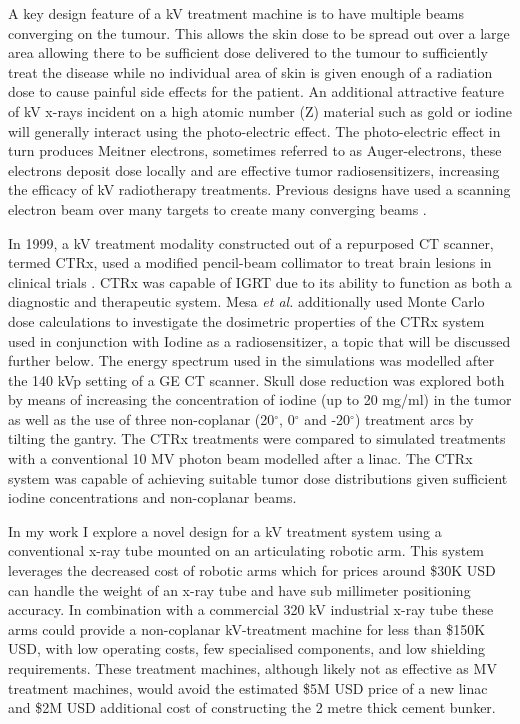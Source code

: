 A key design feature of a kV treatment machine is to have multiple beams converging on the tumour. This allows the skin dose to be spread out over a large area allowing there to be sufficient dose delivered to the tumour to sufficiently treat the disease while no individual area of skin is given enough of a radiation dose to cause painful side effects for the patient. An additional attractive feature of kV x-rays incident on a high atomic number (Z) material such as gold or iodine will generally interact using the photo-electric effect. The photo-electric effect in turn produces Meitner electrons, sometimes referred to as Auger-electrons, these electrons deposit dose locally and are effective tumor radiosensitizers, increasing the efficacy of kV radiotherapy treatments. Previous designs have used a scanning electron beam over many targets to create many converging beams \cite{Breitkreutz2017MontePatients:}.

In 1999, a kV treatment modality constructed out of a repurposed CT scanner, termed CTRx, used a modified pencil-beam collimator to treat brain lesions in clinical trials  \cite{Rose1999FirstCTRx, Mesa1999DoseAgents}. CTRx was capable of IGRT due to its ability to function as both a diagnostic and therapeutic system. Mesa \textit{et al.} additionally used Monte Carlo dose calculations to investigate the dosimetric properties of the CTRx system used in conjunction with Iodine as a radiosensitizer, a topic that will be discussed further below. The energy spectrum used in the simulations was modelled after the 140 kVp setting of a GE CT scanner. Skull dose reduction was explored both by means of increasing the concentration of iodine (up to 20 mg/ml) in the tumor as well as the use of three non-coplanar (20$^{\circ}$, 0$^{\circ}$ and -20$^{\circ}$) treatment arcs by tilting the gantry. The CTRx treatments were compared to simulated treatments with a conventional 10 MV photon beam modelled after a linac. The CTRx system was capable of achieving suitable tumor dose distributions given sufficient iodine concentrations and non-coplanar beams.

In my work I explore a novel design for a kV treatment system using a conventional x-ray tube mounted on an articulating robotic arm. This system leverages the decreased cost of robotic arms which for prices around \$30K USD can handle the weight of an x-ray tube and have sub millimeter positioning accuracy. In combination with a commercial 320 kV industrial x-ray tube these arms could provide a non-coplanar kV-treatment machine for less than \$150K USD, with low operating costs, few specialised components, and low shielding requirements. These treatment machines, although likely not as effective as MV treatment machines, would avoid the estimated \$5M USD price of a new linac and \$2M USD additional cost of constructing the 2 metre thick cement bunker.
